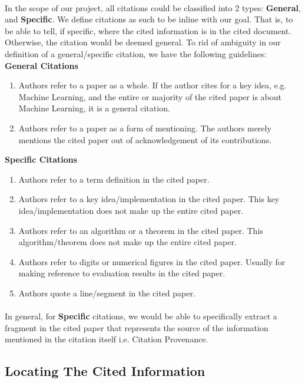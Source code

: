 \paragraph{}
In the scope of our project, all citations could be classified into 2 types: \textbf{General}, and \textbf{Specific}. We define citations as such to be inline with our goal. That is, to be able to tell, if specific, where the cited information is in the cited document. Otherwise, the citation would be deemed general. To rid of ambiguity in our definition of a general/specific citation, we have the following guidelines:\\
\textbf{General Citations}
\begin{enumerate}
\item Authors refer to a paper as a whole. If the author cites for a key idea, e.g. Machine Learning, and the entire or majority of the cited paper is about Machine Learning, it is a general citation.
\item Authors refer to a paper as a form of mentioning. The authors merely mentions the cited paper out of acknowledgement of its contributions.
\end{enumerate}
\textbf{Specific Citations}
\begin{enumerate}
\item Authors refer to a term definition in the cited paper.
\item Authors refer to a key idea/implementation in the cited paper. This key idea/implementation does not make up the entire cited paper.
\item Authors refer to an algorithm or a theorem in the cited paper. This algorithm/theorem does not make up the entire cited paper.
\item Authors refer to digits or numerical figures in the cited paper. Usually for making reference to evaluation results in the cited paper.
\item Authors quote a line/segment in the cited paper.
\end{enumerate}
\paragraph{}
In general, for \textbf{Specific} citations, we would be able to specifically extract a fragment in the cited paper that represents the source of the information mentioned in the citation itself i.e. Citation Provenance.

\subsection{Locating The Cited Information}
